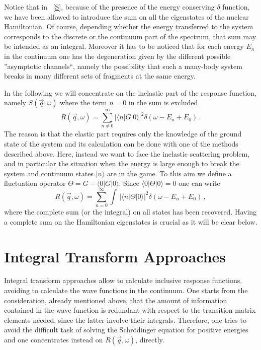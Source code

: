 Notice that in ~\ref{S}, because of the presence of the energy conserving $\delta$ function, we have been allowed to introduce 
the sum on all the eigenstates of the nuclear Hamiltonian. 
Of course, depending whether the energy transferred to the system corresponds to the discrete or the continuum 
part of the spectrum, that sum may be intended as an integral. Moreover it has to be noticed that for each energy $E_n$ in the continuum 
one has the degeneration given by the different possible ''asymptotic channels``, namely the possibility that such a many-body system 
breaks in many different sets of fragments at the same energy. 

In the following we will concentrate on the inelastic part of the response function, namely $S(\vec q,\omega)$ where the term
$n=0$ in the sum is excluded
 \begin{equation}
R(\vec q,\omega)= \sum_{n \neq 0}^\infty |\langle n|G|0\rangle|^2 \delta(\omega-E_n+E_0)\,.
\end{equation}
The reason is that the elastic part requires only the knowledge of the ground state of the system and its calculation 
can be done with one of the methods described above.
Here, instead we want to face the inelastic scattering problem, and in particular the situation when the energy is large 
enough to break the system and continuum states $|n\rangle$ are in the game.  
To this aim we  define a fluctuation operator $\Theta= G - \langle0|G|0\rangle$. Since $\langle0|\Theta|0\rangle=0$ one can write
 \begin{equation}
R(\vec q,\omega)= \sum_{n = 0}^\infty\!\!\!\!\!\!\!\!\!\!\!\int\, |\langle n|\Theta|0\rangle|^2 \delta(\omega-E_n+E_0)\,,
\end{equation}
where the complete sum (or the integral) on all states has been recovered. Having a complete sum on the Hamiltonian eigenstates 
is crucial as it will be clear below. 

\section{Integral Transform Approaches}\label{sec:ITA}

Integral transform  approaches allow to calculate inclusive response functions, 
avoiding to calculate the wave functions in the  continuum.
One starts from the consideration, already mentioned above, that 
the amount of information contained in the  wave function is  
redundant with respect to the transition matrix elements needed, since the latter involve their integrals.
Therefore, one tries to avoid 
the difficult task of solving the Schr\"odinger
equation for positive energies and one concentrates instead on $R(\vec q,\omega)$, directly. 


